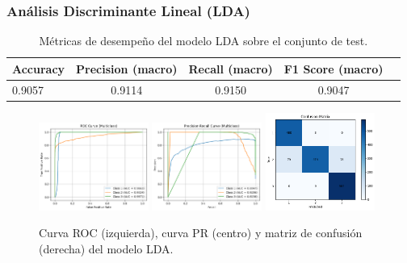 \documentclass[11pt]{article}
\begin{document}
\subsubsection*{Análisis Discriminante Lineal (LDA)}
\begin{table}[H]
    \centering
    \begin{tabular}{lcccc}
        \toprule
        \textbf{Accuracy} & \textbf{Precision (macro)} & \textbf{Recall (macro)} & \textbf{F1 Score (macro)} \\
        \midrule
        0.9057 & 0.9114 & 0.9150 & 0.9047 \\
        \bottomrule
    \end{tabular}
    \caption{Métricas de desempeño del modelo LDA sobre el conjunto de test.}
    \label{tab:lda_scores}
\end{table}

\begin{figure}[H]
    \centering
    \includegraphics[width=0.32\textwidth]{figures/lda_roc.png}
    \hfill
    \includegraphics[width=0.32\textwidth]{figures/lda_pr.png}
    \hfill
    \includegraphics[width=0.32\textwidth]{figures/lda_conf_matrix.png}
    \caption{Curva ROC (izquierda), curva PR (centro) y matriz de confusión (derecha) del modelo LDA.}
    \label{fig:lda_figures}
\end{figure}
\end{document}

